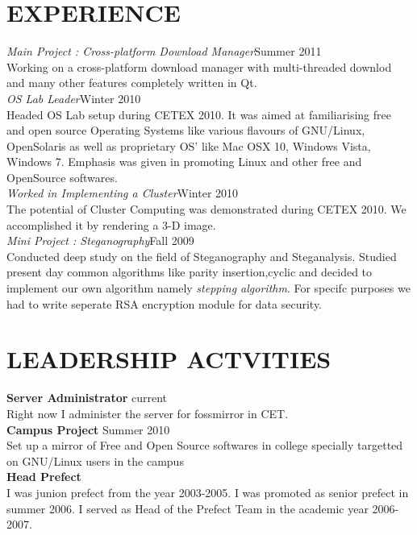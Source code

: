 \begin{resume}
\section{\textsc{EXPERIENCE}}{
  {\it Main Project : Cross-platform Download Manager}\hfill Summer 2011\\
  Working on a cross-platform download manager with multi-threaded downlod and many other features completely written in Qt.\\
  {\it OS Lab Leader}\hfill Winter 2010\\
  Headed OS Lab setup during CETEX 2010. It was aimed at familiarising free and open source Operating Systems like various flavours of
  GNU/Linux, OpenSolaris as well as proprietary OS' like Mac OSX 10, Windows Vista, Windows 7. Emphasis was given in promoting Linux and
  other free and OpenSource softwares.\\
  {\it Worked in Implementing a Cluster}\hfill Winter 2010\\
  The potential of Cluster Computing was demonstrated during CETEX 2010. We accomplished it by rendering a 3-D image.\\
  {\it Mini Project : Steganography}\hfill Fall 2009\\
  Conducted deep study on the field of Steganography and Steganalysis. Studied present day common algorithms like parity insertion,cyclic
  and decided to implement our own algorithm namely {\it stepping algorithm}. For specifc purposes we had to write seperate RSA encryption
  module for data security.\\
}

\section{\textsc{LEADERSHIP ACTVITIES}}{
\textbf{Server Administrator} \hfill current\\
Right now I administer the server for fossmirror in CET.\\
  \textbf{Campus Project} \hfill Summer 2010\\
  Set up a mirror of Free and Open Source softwares in college specially targetted on GNU/Linux users in the campus\\
  \textbf{Head Prefect}\\
  I was junion prefect from the year 2003-2005. I was promoted as senior prefect in summer 2006. I served as Head of the Prefect Team in the academic year 2006-2007.\\
}


\end{resume}
